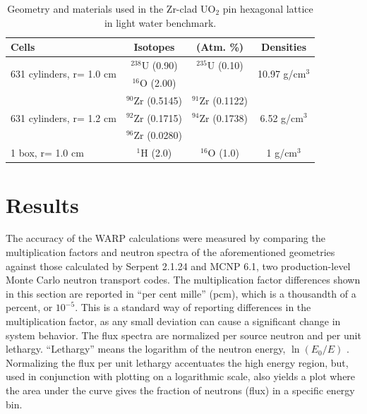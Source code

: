 \documentclass[preprint,12pt]{elsarticle}
\begin{document}
\begin{table}[h]
\centering
\caption{Geometry and materials used in the Zr-clad UO$_2$ pin hexagonal lattice in light water benchmark.}
\label{hex_geom}
\begin{tabular}{| l | c  c | c |}
\hline
Cells & Isotopes & (Atm. \%) & Densities \\
\hline
\multirow{2}{*}{631 cylinders, r= 1.0 cm }  &   $^{238}$U   (0.90)   &    $^{235}$U   (0.10)  &  \multirow{2}{*}{10.97 g/cm$^3$} \\
                                           &   $^{16}$O    (2.00)   &                        &  \\
\hline
\multirow{3}{*}{631 cylinders, r= 1.2 cm }  &   $^{90}$Zr   (0.5145) &    $^{91}$Zr   (0.1122)&  \multirow{3}{*}{6.52 g/cm$^3$} \\
                                           &   $^{92}$Zr   (0.1715) &    $^{94}$Zr   (0.1738)& \\
                                           &   $^{96}$Zr   (0.0280) &                        & \\
\hline
\multirow{1}{*}{1 box, r= 1.0 cm }         &   $^{1}$H     (2.0)    &   $^{16}$O  (1.0) & \multirow{1}{*}{1 g/cm$^3$} \\
\hline
\end{tabular}
\end{table}




\newpage
\section{Results}
\label{sec:results}
 

The accuracy of the WARP calculations were measured by comparing the multiplication factors and neutron spectra of the aforementioned geometries against those calculated by Serpent 2.1.24 and MCNP 6.1, two production-level Monte Carlo neutron transport codes.  The multiplication factor differences shown in this section are reported in ``per cent mille'' (pcm), which is a thousandth of a percent, or $10^{-5}$.  This is a standard way of reporting differences in the multiplication factor, as any small deviation can cause a significant change in system behavior.  The flux spectra are normalized per source neutron and per unit lethargy.   ``Lethargy'' means the logarithm of the neutron energy, $\ln(E_0/E)$ \cite{duderstadt}.  Normalizing the flux per unit lethargy accentuates the high energy region, but, used in conjunction with plotting on a logarithmic scale, also yields a plot where the area under the curve gives the fraction of neutrons (flux) in a specific energy bin. 
\end{document}
